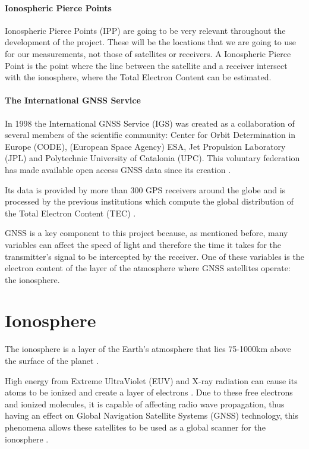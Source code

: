 \paragraph{Ionospheric Pierce Points}

Ionospheric Pierce Points (IPP) are going to be very relevant throughout the development of the project. These will be the locations that we are going to use for our measurements, not those of satellites or receivers. A Ionospheric Pierce Point is the point where the line between the satellite and a receiver intersect with the ionosphere, where the Total Electron Content can be estimated. \cite{fu2000satellite}

\paragraph{The International GNSS Service}

In 1998 the International GNSS Service (IGS) was created as a collaboration of several members of the scientific community: Center for Orbit Determination in Europe (CODE), (European Space Agency) ESA, Jet Propulsion Laboratory (JPL) and Polytechnic University of Catalonia (UPC). This voluntary federation has made available open access GNSS data since its creation \cite{igswebsite} \cite{dow2009international}. 

Its data is provided by more than 300 GPS receivers around the globe and is processed by the previous institutions which compute the global distribution of the Total Electron Content (TEC) \cite{hernandez2009igs}.

GNSS is a key component to this project because, as mentioned before, many variables can affect the speed of light and therefore the time it takes for the transmitter's signal to be intercepted by the receiver. One of these variables is the electron content of the layer of the atmosphere where GNSS satellites operate: the ionosphere.

\section{Ionosphere}

The ionosphere is a layer of the Earth’s atmosphere that lies 75-1000km above the surface of the planet \cite{ionospherestandford}. 

High energy from Extreme UltraViolet (EUV) and X-ray radiation can cause its atoms to be ionized and create a layer of electrons \cite{noaa2ionosphere}. Due to these free electrons and ionized molecules, it is capable of affecting radio wave propagation, thus having an effect on Global Navigation Satellite Systems (GNSS) technology, this phenomena allows these satellites to be used as a global scanner for the ionosphere \cite{hernandez2011ionosphere}. 

